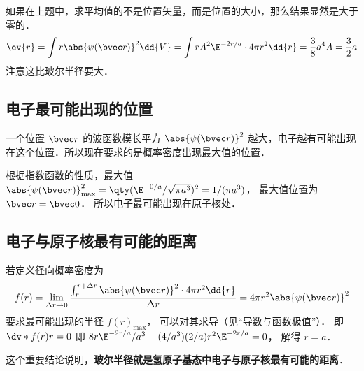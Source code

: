 如果在上题中，求平均值的不是位置矢量，而是位置的大小，那么结果显然是大于零的．
\begin{equation}
\ev{r} = \int r \abs{\psi (\bvec r)}^2 \dd{V} = \int r A^2 \E^{-2r/a} \cdot 4\pi r^2 \dd{r} = \frac{3}{8} a^4 A = \frac{3}{2}a
\end{equation}
注意这比玻尔半径要大．

\subsection{电子最可能出现的位置}

一个位置 $\bvec r$ 的波函数模长平方 $\abs{\psi(\bvec r)}^2$ 越大，电子越有可能出现在这个位置．所以现在要求的是概率密度出现最大值的位置．
 
根据指数函数的性质，最大值 $\abs{\psi (\bvec r)}_{\max}^2 = \qty( \E^{-0/a}/\sqrt{\pi a^3})^2 = 1/(\pi a^3)$， 最大值位置为 $\bvec r = \bvec 0$． 所以电子最可能出现在原子核处．

\subsection{电子与原子核最有可能的距离}
若定义径向概率密度为
\begin{equation}
f(r) = \lim_{\Delta r \to 0} \frac{\int_r^{r + \Delta r} {\abs{\psi (\bvec r)}}^2 \cdot 4\pi r^2 \dd{r} }{\Delta r} = 4\pi r^2 \abs{\psi(\bvec r)}^2
\end{equation}
要求最可能出现的半径 $f(r)_{\max}$， 可以对其求导（见“导数与函数极值”）． 即 $\dv*{f(r)}{r} = 0$ 即 $8 r \E^{-2r/a}/a^3 - (4/a^3)(2/a)r^2 \E^{-2r/a} = 0$， 解得 $r = a$． 
 
这个重要结论说明，\textbf{玻尔半径就是氢原子基态中电子与原子核最有可能的距离}．
